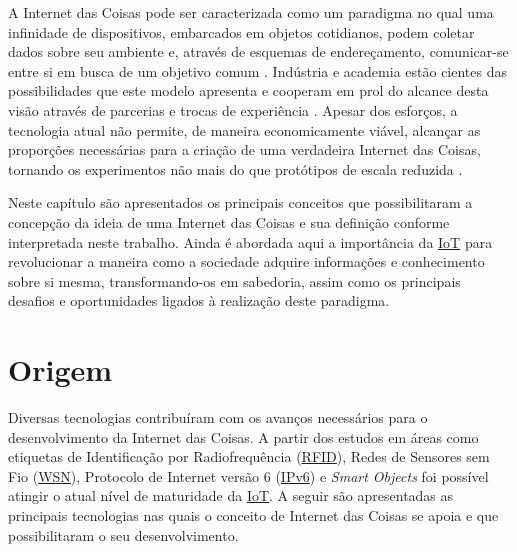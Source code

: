 \documentclass[twoside,english,brazilian]{UNISINOSmonografia}
\begin{document}
A Internet das Coisas pode ser caracterizada como um paradigma no qual uma 
infinidade de dispositivos, embarcados em objetos cotidianos, podem coletar 
dados sobre seu ambiente e, através de esquemas de endereçamento, comunicar-se 
entre si em busca de um objetivo comum \cite{Atzori2010b}.
Indústria e academia estão cientes das possibilidades que este modelo 
apresenta e cooperam em prol do alcance desta visão através de parcerias e 
trocas de experiência  \cite{ITU2005}.
Apesar dos esforços, a tecnologia atual não permite, de maneira economicamente 
viável, alcançar as proporções necessárias para a criação de uma verdadeira 
Internet das Coisas, tornando os experimentos não mais do que protótipos de 
escala reduzida \cite{Smith2012}.


Neste capítulo são apresentados os principais conceitos que possibilitaram a 
concepção da ideia de uma Internet das Coisas e sua definição conforme 
interpretada neste trabalho.
Ainda é abordada aqui a importância da \hyperref[siglas]{IoT} para revolucionar a maneira como a 
sociedade adquire informações e conhecimento sobre si mesma, transformando-os 
em sabedoria, assim como os principais desafios e oportunidades ligados à 
realização deste paradigma.


\section{Origem}

	Diversas tecnologias contribuíram com os avanços necessários para o 
	desenvolvimento da Internet das Coisas. A partir dos estudos em áreas como 
	etiquetas de Identificação por Radiofrequência (\hyperref[siglas]{RFID}), Redes de 
	Sensores sem Fio (\hyperref[siglas]{WSN}), Protocolo de Internet versão 6 (\hyperref[siglas]{IPv6}) e \textit{Smart 
	Objects} foi possível atingir o atual nível de maturidade da \hyperref[siglas]{IoT}.
	A seguir são apresentadas as principais tecnologias nas quais o conceito de 
	Internet das Coisas se apoia e que possibilitaram o seu desenvolvimento.


\end{document}
